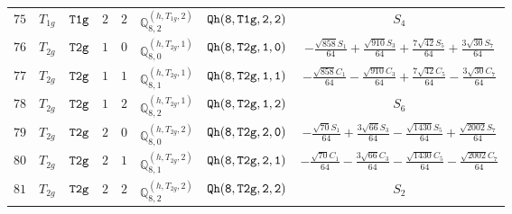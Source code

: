 \documentclass[fleqn,8pt]{jsarticle}
\begin{document}
\begin{table}[ht!]
\begin{center}
\begin{tabular}{cccccccc}
$ 75 $ & $ T_{1g} $ & $ {\tt T1g} $ & $ 2 $ & $ 2 $ & $ \mathbb{Q}_{8,2}^{(h,T_{1g},2)} $ & $ {\tt Qh(8,T1g,2,2)} $ & $ S_{4} $ \\
$ 76 $ & $ T_{2g} $ & $ {\tt T2g} $ & $ 1 $ & $ 0 $ & $ \mathbb{Q}_{8,0}^{(h,T_{2g},1)} $ & $ {\tt Qh(8,T2g,1,0)} $ & $ - \frac{\sqrt{858} S_{1}}{64} + \frac{\sqrt{910} S_{3}}{64} + \frac{7 \sqrt{42} S_{5}}{64} + \frac{3 \sqrt{30} S_{7}}{64} $ \\
$ 77 $ & $ T_{2g} $ & $ {\tt T2g} $ & $ 1 $ & $ 1 $ & $ \mathbb{Q}_{8,1}^{(h,T_{2g},1)} $ & $ {\tt Qh(8,T2g,1,1)} $ & $ - \frac{\sqrt{858} C_{1}}{64} - \frac{\sqrt{910} C_{3}}{64} + \frac{7 \sqrt{42} C_{5}}{64} - \frac{3 \sqrt{30} C_{7}}{64} $ \\
$ 78 $ & $ T_{2g} $ & $ {\tt T2g} $ & $ 1 $ & $ 2 $ & $ \mathbb{Q}_{8,2}^{(h,T_{2g},1)} $ & $ {\tt Qh(8,T2g,1,2)} $ & $ S_{6} $ \\
$ 79 $ & $ T_{2g} $ & $ {\tt T2g} $ & $ 2 $ & $ 0 $ & $ \mathbb{Q}_{8,0}^{(h,T_{2g},2)} $ & $ {\tt Qh(8,T2g,2,0)} $ & $ - \frac{\sqrt{70} S_{1}}{64} + \frac{3 \sqrt{66} S_{3}}{64} - \frac{\sqrt{1430} S_{5}}{64} + \frac{\sqrt{2002} S_{7}}{64} $ \\
$ 80 $ & $ T_{2g} $ & $ {\tt T2g} $ & $ 2 $ & $ 1 $ & $ \mathbb{Q}_{8,1}^{(h,T_{2g},2)} $ & $ {\tt Qh(8,T2g,2,1)} $ & $ - \frac{\sqrt{70} C_{1}}{64} - \frac{3 \sqrt{66} C_{3}}{64} - \frac{\sqrt{1430} C_{5}}{64} - \frac{\sqrt{2002} C_{7}}{64} $ \\
$ 81 $ & $ T_{2g} $ & $ {\tt T2g} $ & $ 2 $ & $ 2 $ & $ \mathbb{Q}_{8,2}^{(h,T_{2g},2)} $ & $ {\tt Qh(8,T2g,2,2)} $ & $ S_{2} $ \\
 \hline \hline
\end{tabular}
\end{center}
\end{table}
\end{document}
